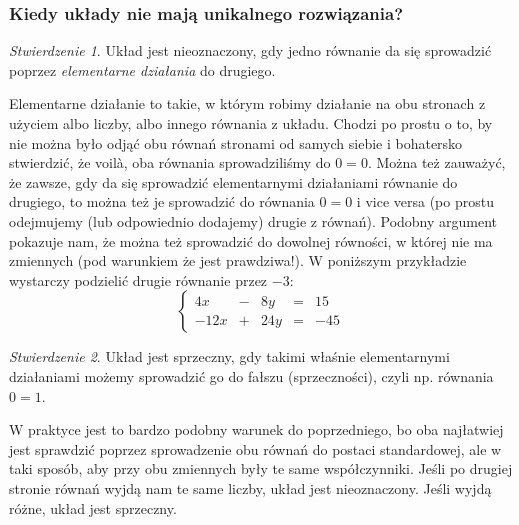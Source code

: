 \documentclass{article}
\theoremstyle{remark}
\newtheorem{lemma}{Stwierdzenie}[subsubsection]
\begin{document}
\subsubsection{Kiedy układy nie mają unikalnego rozwiązania?}
\begin{lemma}
  Układ jest nieoznaczony, gdy jedno równanie da się sprowadzić poprzez
  \textit{elementarne działania}
  do drugiego.
\end{lemma}

Elementarne działanie 
to takie, w którym robimy działanie na obu stronach z użyciem
albo liczby, albo innego równania z układu. Chodzi po prostu o to, by
nie można było odjąć obu równań stronami od samych siebie i bohatersko stwierdzić, że
voilà, oba równania sprowadziliśmy do $0=0$. Można też zauważyć, że zawsze, gdy da się
sprowadzić elementarnymi działaniami równanie do drugiego, to można też je sprowadzić do
równania $0=0$ i vice versa
(po prostu odejmujemy (lub odpowiednio dodajemy) drugie z równań). Podobny argument
pokazuje nam, że można też sprowadzić do dowolnej równości, w której nie ma zmiennych
(pod warunkiem że jest prawdziwa!).
W poniższym przykładzie wystarczy podzielić drugie równanie przez $-3$:
\begin{displaymath}
  \left\{
    \begin{array}{lllll}
      4x &-& 8y &=& 15\\
      -12x &+& 24y &=& -45
    \end{array}
  \right.
\end{displaymath}


\begin{lemma}
  Układ jest sprzeczny, gdy takimi właśnie elementarnymi działaniami możemy sprowadzić go
  do fałszu (sprzeczności), czyli np. równania $0=1$.  
\end{lemma}

W praktyce jest to bardzo podobny warunek do poprzedniego, bo oba najłatwiej jest
sprawdzić poprzez sprowadzenie obu równań do postaci standardowej, ale w taki sposób,
aby przy obu zmiennych były te same współczynniki. Jeśli po drugiej stronie równań
wyjdą nam te same liczby, układ jest nieoznaczony. Jeśli wyjdą różne, układ jest sprzeczny.
\end{document}
